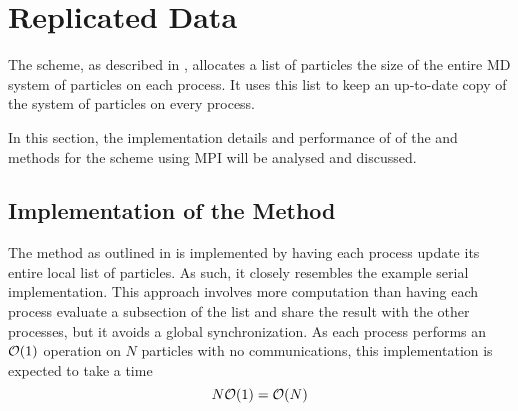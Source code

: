 \section{Replicated Data}

The \replicateddata{} scheme, as described in
,
allocates a list of particles the size of
the entire MD system of particles
on each process.
%
It uses this list to keep an up-to-date copy of the system of particles
on every process.

In this section, the implementation details and performance of
of the \individualoperation{} and \pairoperation{} methods
for the \replicateddata{} scheme using MPI will be analysed and discussed.


%
%

\subsection{Implementation of the \individualoperation{} Method}

The \individualoperation{} method as outlined in
is implemented by having each process update
its entire local list of particles.
%
As such, it closely resembles the example serial implementation.
%
This approach involves more computation than having each process
evaluate a subsection of the list and share the result with the
other processes, but it avoids a global synchronization.
%
As each process performs an $\mathcal{O}{\left({ 1 }\right)}$ operation on $N$ particles with
no communications,
this implementation is expected to take a time
\begin{equation}
\label{eqn:v0_replicated_individual_operation_overall_time}
    N\mathcal{O}{\left({ 1 }\right)} = \mathcal{O}{\left({ N }\right)}
\end  {equation}

\begin{figure}[!h]
    
    \caption{}
    \label{fig:v0_replicated_individual_operation_512_time}
\end  {figure}

\begin{figure}[!h]
    
    \caption{}
    \label{fig:v0_replicated_individual_operation_4096_time}
\end  {figure}

